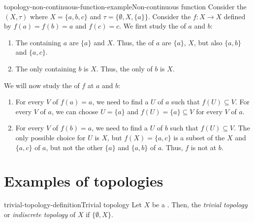 \documentclass[preview]{standalone}
\begin{document}
\begin{snippetexample}{topology-non-continuous-function-example}{Non-continuous function}
    Consider the \topologicalspace \((X, \tau)\)
    where \(X = \{a, b, c\}\) and \(\tau = \{\emptyset, X, \{a\}\}\).
    Consider the \function \(f\colon X \to X\) defined by
    \(f(a) = f(b) = a\) and \(f(c) = c\).
    We first study the \neighborhood[neighborhoods] of \(a\) and \(b\):
    \begin{enumerate}
        \item The  containing \(a\)
        are \(\{a\}\) and \(X\). Thus, the \neighborhood[neighborhoods] of \(a\) are
        \(\{a\}\), \(X\), but also \(\{a, b\}\) and \(\{a, c\}\).
        \item The only \openset containing \(b\)
        is \(X\). Thus, the only \neighborhood of \(b\) is
        \(X\).
    \end{enumerate}
    We will now study the \topologycontinuous[continuity] of \(f\) at \(a\) and \(b\):
    \begin{enumerate}
        \item For every \neighborhood \(V\) of \(f(a) = a\),
        we need to find a \neighborhood \(U\) of \(a\) such that
        \(f(U) \subseteq V\). For every \neighborhood \(V\) of \(a\),
        we can choose \(U = \{a\}\) and \(f(U) = \{a\} \subseteq V\)
        for every \neighborhood \(V\) of \(a\).
        \item For every \neighborhood \(V\) of \(f(b) = a\),
        we need to find a \neighborhood \(U\) of \(b\) such that
        \(f(U) \subseteq V\). The only possible choice for \(U\) is \(X\),
        but \(f(X) = \{a, c\}\) is a subset of the \neighborhood[neighborhoods] \(X\)
        and \(\{a, c\}\) of \(a\), but not the other \neighborhood[neighborhoods] \(\{a\}\) and \(\{a, b\}\)
        of \(a\). Thus, \(f\) is not \topologycontinuous at \(b\).
    \end{enumerate}
\end{snippetexample}

\section{Examples of topologies}

\begin{snippetdefinition}{trivial-topology-definition}{Trivial topology}
    Let \(X\) be a \set. Then, the \emph{trivial topology}
    or \emph{indiscrete topology} of \(X\) if \(\{\emptyset, X\}\).
\end{snippetdefinition}
\end{document}
